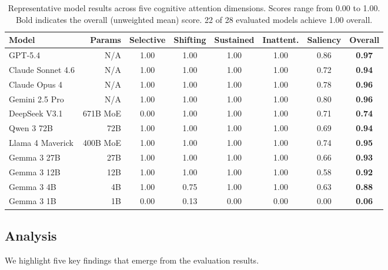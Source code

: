\documentclass{article}
\begin{document}
\begin{table}[h]
  \centering
  \small
  \caption{Representative model results across five cognitive attention dimensions. Scores range from 0.00 to 1.00. Bold indicates the overall (unweighted mean) score. 22 of 28 evaluated models achieve 1.00 overall.}
  \label{tab:main_results}
  \begin{tabular}{lrcccccc}
    \toprule
    Model & Params & Selective & Shifting & Sustained & Inattent. & Saliency & \textbf{Overall} \\
    \midrule
    GPT-5.4              & N/A      & 1.00 & 1.00 & 1.00 & 1.00 & 0.86 & \textbf{0.97} \\
    Claude Sonnet 4.6    & N/A      & 1.00 & 1.00 & 1.00 & 1.00 & 0.72 & \textbf{0.94} \\
    Claude Opus 4        & N/A      & 1.00 & 1.00 & 1.00 & 1.00 & 0.78 & \textbf{0.96} \\
    Gemini 2.5 Pro       & N/A      & 1.00 & 1.00 & 1.00 & 1.00 & 0.80 & \textbf{0.96} \\
    DeepSeek V3.1        & 671B MoE & 0.00 & 1.00 & 1.00 & 1.00 & 0.71 & \textbf{0.74} \\
    Qwen 3 72B           & 72B      & 1.00 & 1.00 & 1.00 & 1.00 & 0.69 & \textbf{0.94} \\
    Llama 4 Maverick     & 400B MoE & 1.00 & 1.00 & 1.00 & 1.00 & 0.74 & \textbf{0.95} \\
    Gemma 3 27B          & 27B      & 1.00 & 1.00 & 1.00 & 1.00 & 0.66 & \textbf{0.93} \\
    Gemma 3 12B          & 12B      & 1.00 & 1.00 & 1.00 & 1.00 & 0.58 & \textbf{0.92} \\
    Gemma 3 4B           & 4B       & 1.00 & 0.75 & 1.00 & 1.00 & 0.63 & \textbf{0.88} \\
    Gemma 3 1B           & 1B       & 0.00 & 0.13 & 0.00 & 0.00 & 0.00 & \textbf{0.06} \\
    \bottomrule
  \end{tabular}
\end{table}

\subsection{Analysis}
\label{sec:analysis}

We highlight five key findings that emerge from the evaluation results.
\end{document}

